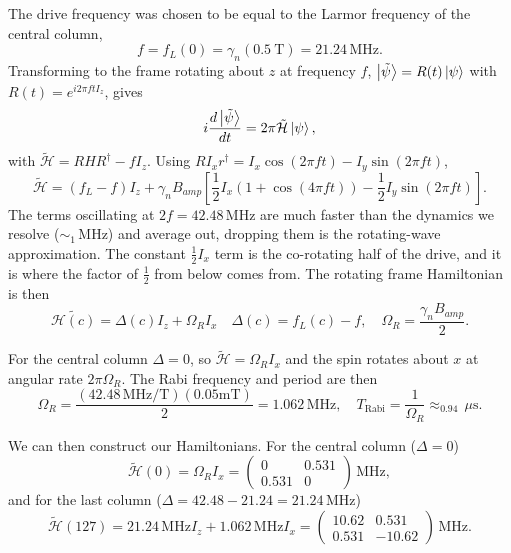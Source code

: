 \documentclass{article}
\newcommand{\MHz}{\,\mathrm{MHz}}
\newcommand{\us}{\,\mu\mathrm{s}}
\newcommand{\TR}{T_{\mathrm{Rabi}}}
\newcommand{\OmR}{\Omega_R}
\begin{document}
The drive frequency was chosen to be equal to the Larmor frequency of the central column,
\begin{equation}
    f=f_L(0)=\gamma _n(0.5\ \text{T})=21.24\MHz.
\end{equation}
Transforming to the frame rotating about $z$ at frequency $f$, $\ket{\tilde\psi }=R(t)\ket{\psi }$ with $R(t)=e^{i 2\pi ftI_z}$, gives
\begin{equation}
    i \frac{d \ket{\tilde\psi }}{d t}=2\pi \tilde{\mathcal{H}}\ket{\psi },
\end{equation}
with $\tilde{\mathcal{H}}=R HR^\dagger-f I_z$. Using $RI_xr^\dagger=I_x\cos(2\pi ft)-I_y \sin(2\pi ft)$,
\begin{equation}
    \tilde{\mathcal{H}}=\left( f_L-f \right)I_z+\gamma _nB_{amp}\left[ \frac{1}{2}I_x \left( 1+\cos(4\pi ft) \right)-\frac{1}{2}I_y\sin(2\pi ft) \right].
\end{equation}
The terms oscillating at $2f=42.48\MHz$ are much faster than the dynamics we resolve ($\sim_{1}\MHz$) and average out, dropping them is the rotating-wave approximation. The constant $\frac{1}{2}I_x$ term is the co-rotating half of the drive, and it is where the factor of $\frac{1}{2}$ from below comes from. The rotating frame Hamiltonian is then
\begin{equation}
    \tilde{\mathcal{H}(c)}=\Delta (c)I_z+\OmR I_x\quad\Delta (c)=f_L(c)-f,\quad\OmR=\frac{\gamma _nB_{amp}}{2}. \label{eq:Hrot}
\end{equation}

For the central column $\Delta =0$, so $\tilde{\mathcal{H}}=\OmR I_x$ and the spin rotates about $x$ at angular rate $2\pi \OmR$. The Rabi frequency and period are then
\begin{equation}
    \OmR=\frac{(42.48\MHz/\text{T})(0.05 \text{mT})}{2}=1.062\MHz,\quad \TR=\frac{1}{\OmR}\approx_0.94\us.
\end{equation}

We can then construct our Hamiltonians. For the central column ($\Delta =0$)
\begin{equation}
    \tilde{\mathcal{H}}(0)=\OmR I_x=\begin{pmatrix}
        0 & 0.531 \\ 0.531 & 0
    \end{pmatrix} \MHz,
\end{equation}
and for the last column ($\Delta =42.48-21.24=21.24\MHz$)
\begin{equation}
    \tilde{\mathcal{H}}(127)=21.24\MHz I_z + 1.062 \MHz I_x=\begin{pmatrix}
        10.62 & 0.531 \\ 0.531&-10.62
    \end{pmatrix}\MHz.
\end{equation}
\end{document}
